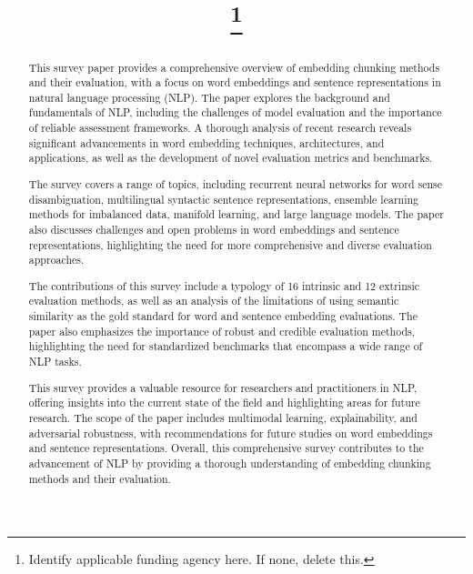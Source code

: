 \documentclass[conference]{IEEEtran}
\begin{document}
\title{
\thanks{Identify applicable funding agency here. If none, delete this.}
}

\author{
\and
{}
}

\maketitle

\begin{abstract}
This survey paper provides a comprehensive overview of embedding chunking methods and their evaluation, with a focus on word embeddings and sentence representations in natural language processing (NLP). The paper explores the background and fundamentals of NLP, including the challenges of model evaluation and the importance of reliable assessment frameworks. A thorough analysis of recent research reveals significant advancements in word embedding techniques, architectures, and applications, as well as the development of novel evaluation metrics and benchmarks.

The survey covers a range of topics, including recurrent neural networks for word sense disambiguation, multilingual syntactic sentence representations, ensemble learning methods for imbalanced data, manifold learning, and large language models. The paper also discusses challenges and open problems in word embeddings and sentence representations, highlighting the need for more comprehensive and diverse evaluation approaches.

The contributions of this survey include a typology of 16 intrinsic and 12 extrinsic evaluation methods, as well as an analysis of the limitations of using semantic similarity as the gold standard for word and sentence embedding evaluations. The paper also emphasizes the importance of robust and credible evaluation methods, highlighting the need for standardized benchmarks that encompass a wide range of NLP tasks.

This survey provides a valuable resource for researchers and practitioners in NLP, offering insights into the current state of the field and highlighting areas for future research. The scope of the paper includes multimodal learning, explainability, and adversarial robustness, with recommendations for future studies on word embeddings and sentence representations. Overall, this comprehensive survey contributes to the advancement of NLP by providing a thorough understanding of embedding chunking methods and their evaluation.
\end{abstract}
\end{document}
